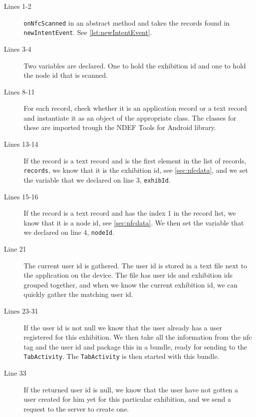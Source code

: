 \begin{description}
\item[Lines 1-2] \lstinline|onNfcScanned| in an abstract method and takes the records found in \lstinline|newIntentEvent|. See \autoref{lst:newIntentEvent}.
\item[Lines 3-4] Two variables are declared. One to hold the exhibition id and one to hold the node id that is scanned.
\item[Lines 8-11] For each record, check whether it is an application record or a text record and instantiate it as an object of the appropriate class. The classes for these are imported trough the NDEF Tools for Android \citep{ndeftools} library.
\item[Lines 13-14] If the record is a text record and is the first element in the list of records, \lstinline|records|, we know that it is the exhibition id, see \autoref{sec:nfcdata}, and we set the variable that we declared on line 3, \lstinline|exhibId|.
\item[Lines 15-16] If the record is a text record and has the index 1 in the record list, we know that it is a node id, see \autoref{sec:nfcdata}. We then set the variable that we declared on line 4, \lstinline|nodeId|.
\item[Line 21] The current user id is gathered. The user id is stored in a text file next to the application on the device. The file has user ids and exhibition ids grouped together, and when we know the current exhibition id, we can quickly gather the matching user id.
\item[Lines 23-31] If the user id is not null we know that the user already has a user registered for this exhibition. We then take all the information from the \ac{nfc} tag and the user id and package this in a bundle, ready for sending to the \lstinline|TabActivity|. The \lstinline|TabActivity| is then started with this bundle.
\item[Line 33] If the returned user id is null, we know that the user have not gotten a user created for him yet for this particular exhibition, and we send a request to the server to create one.
\end{description}


